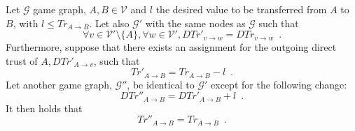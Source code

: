 {}
\begin{theorem}
\label{riskinv}
   Let $\mathcal{G}$ game graph, $A, B \in \mathcal{V}$ and $l$ the desired value to be transferred from $A$ to $B$,
   with $l \leq Tr_{A \rightarrow B}$. Let also $\mathcal{G}'$ with the same nodes as $\mathcal{G}$ such that
   \begin{equation*}
      \forall v \in \mathcal{V}' \setminus \{A\}, \forall w \in \mathcal{V}', DTr'_{v \rightarrow w} =
      DTr_{v \rightarrow w} \enspace.
   \end{equation*}
   Furthermore, suppose that there exists an assignment for the outgoing direct trust of $A, DTr'_{A \rightarrow v}$, such
   that
   \begin{equation}
   \label{primetrust}
      Tr'_{A \rightarrow B} = Tr_{A \rightarrow B} - l \enspace.
   \end{equation}
   Let another game graph, $\mathcal{G}''$, be identical to $\mathcal{G}'$ except for the following change:
   \begin{equation*}
      DTr''_{A \rightarrow B} = DTr'_{A \rightarrow B} + l \enspace.
   \end{equation*}
   It then holds that
   \begin{equation*}
      Tr''_{A \rightarrow B} = Tr_{A \rightarrow B} \enspace.
   \end{equation*}
\end{theorem}
